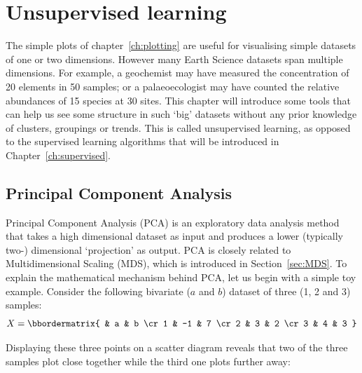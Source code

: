 \chapter{Unsupervised learning}
\label{ch:unsupervised}

The simple plots of chapter~\ref{ch:plotting} are useful for
visualising simple datasets of one or two dimensions. However many
Earth Science datasets span multiple dimensions. For example, a
geochemist may have measured the concentration of 20 elements in 50
samples; or a palaeoecologist may have counted the relative abundances
of 15 species at 30 sites. This chapter will introduce some tools that
can help us see some structure in such `big' datasets without any
prior knowledge of clusters, groupings or trends.  This is called
unsupervised learning, as opposed to the supervised learning
algorithms that will be introduced in Chapter~\ref{ch:supervised}.

\section{Principal Component Analysis}
\label{sec:PCA}

Principal Component Analysis (PCA) is an exploratory data analysis
method that takes a high dimensional dataset as input and produces a
lower (typically two-) dimensional `projection' as output. PCA is
closely related to Multidimensional Scaling (MDS), which is introduced
in Section~\ref{sec:MDS}. To explain the mathematical mechanism behind
PCA, let us begin with a simple toy example.  Consider the following
bivariate ($a$ and $b$) dataset of three (1, 2 and 3) samples:
\begin{equation}
  X = \bbordermatrix{ & a & b \cr
    1 & -1 & 7 \cr
    2 & 3 & 2 \cr
    3 & 4 & 3
  }
  \label{eq:X}
\end{equation}

Displaying these three points on a scatter diagram reveals that two of
the three samples plot close together while the third one plots
further away:

